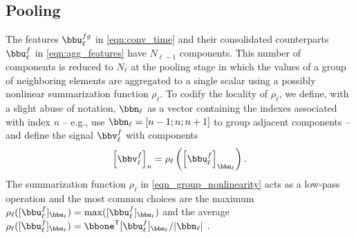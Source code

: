 %
\subsection{Pooling}\label{sec_cnn_pooling}

The features $\bbu_{\ell}^{fg}$ in \eqref{eqn:conv_time} and their consolidated counterparts $\bbu_{\ell}^{f}$ in \eqref{eqn:agg_features} have $N_{\ell-1}$ components. This number of components is reduced to $N_{\ell}$ at the pooling stage in which the values of a group of neighboring elements are aggregated to a single scalar using a possibly nonlinear summarization function $\rho_\ell$. To codify the locality of $\rho_\ell$, we define, with a slight abuse of notation, $\bbn_\ell$ as a vector containing the indexes associated with index $n$ -- e.g., use $\bbn_\ell=[n-1; n; n+1]$ to group adjacent components -- and define the signal $\bbv^{f}_{\ell}$ with components
\begin{equation}\label{eqn_group_nonlinearity}
   \Big[\bbv^{f}_{\ell}\Big]_n 
            = \rho_{\ell}\left( \Big[\bbu_{\ell}^f\Big]_{\bbn_\ell}\right).
\end{equation}
%
The summarization function $\rho_{\ell}$ in \eqref{eqn_group_nonlinearity} acts as a low-pass operation and the most common choices are the maximum $\rho_{\ell}( [\bbu_{\ell}^f]_{\bbn_\ell}) = \max( [\bbu_{\ell}^f]_{\bbn_\ell})$ and the average  $\rho_{\ell}( [\bbu_{\ell}^f]_{\bbn_\ell}) = \bbone^{\Tr} [\bbu_{\ell}^f]_{\bbn_\ell}/ |\bbn_\ell|$ \cite{wiatowski17-maththeory}.

